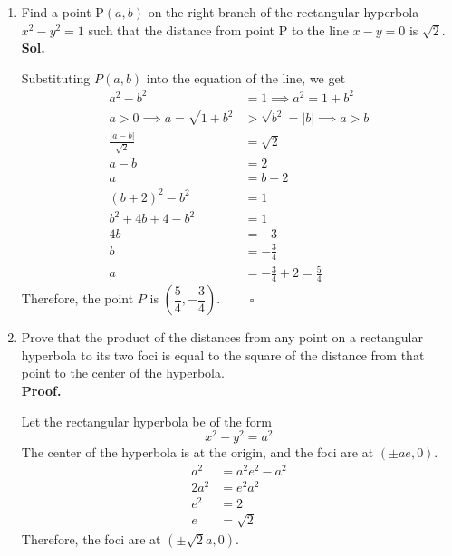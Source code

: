 \documentclass{report}
\newcommand{\sol}{\vspace{1em}\\\textbf{Sol.}}
\newcommand{\proof}{\vspace{1em}\\\textbf{Proof.}}
\newcommand{\eos}{ \qquad \square}
\begin{document}
\begin{enumerate}[leftmargin=*]
    \item Find a point $\mathrm{P}(a, b)$ on the right branch of the rectangular
          hyperbola $x^2-y^2=1$ such that the distance from point $\mathrm{P}$ to the
          line $x-y=0$ is $\sqrt{2}$. \sol{}

          Substituting $P(a,b)$ into the equation of the line, we get
          \begin{align*}
              a^2 - b^2                         & = 1 \implies a^2 = 1 + b^2        \\
              a > 0 \implies a = \sqrt{1 + b^2} & > \sqrt{b^2} = |b| \implies a > b \\
              \frac{|a - b|}{\sqrt{2}}          & = \sqrt{2}                        \\
              a - b                             & = 2                               \\
              a                                 & = b + 2                           \\
              (b+2)^2 - b^2                     & = 1                               \\
              b^2 + 4b + 4 - b^2                & = 1                               \\
              4b                                & = -3                              \\
              b                                 & = -\frac{3}{4}                    \\
              a                                 & = -\frac{3}{4} + 2 = \frac{5}{4}
          \end{align*}
          Therefore, the point $P$ is $\left(\dfrac{5}{4}, -\dfrac{3}{4}\right)$. $\eos$

    \item Prove that the product of the distances from any point on a rectangular
          hyperbola to its two foci is equal to the square of the distance from that
          point to the center of the hyperbola. \proof{}

          Let the rectangular hyperbola be of the form
          \begin{equation*}
              x^2 - y^2 = a^2
          \end{equation*}
          The center of the hyperbola is at the origin, and the foci are at $(\pm ae, 0)$.
          \begin{align*}
              a^2  & = a^2e^2 - a^2 \\
              2a^2 & = e^2a^2       \\
              e^2  & = 2            \\
              e    & = \sqrt{2}
          \end{align*}
          Therefore, the foci are at $(\pm \sqrt{2}a, 0)$.


\end{enumerate}
\end{document}
